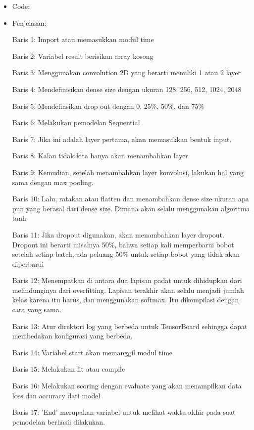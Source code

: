 \begin{itemize}
\item Code:


\item Penjelasan:

Baris 1: Import atau memasukkan modul time

Baris 2: Variabel result berisikan array kosong

Baris 3: Menggunakan convolution 2D yang berarti memiliki 1 atau 2 layer

Baris 4: Mendefinisikan dense size dengan ukuran 128, 256, 512, 1024, 2048

Baris 5: Mendefinsikan drop out dengan 0, 25\%, 50\%, dan 75\%

Baris 6: Melakukan pemodelan Sequential

Baris 7: Jika ini adalah layer pertama, akan memasukkan bentuk input.

Baris 8: Kalau tidak kita hanya akan menambahkan layer.

Baris 9: Kemudian, setelah menambahkan layer konvolusi, lakukan hal yang sama dengan max pooling.

Baris 10: Lalu, ratakan atau flatten dan menambahkan dense size ukuran apa pun yang berasal dari dense size. Dimana akan selalu menggunakan algoritma tanh

Baris 11: Jika dropout digunakan, akan menambahkan layer dropout. Dropout ini berarti misalnya 50\%, bahwa setiap kali memperbarui bobot setelah setiap batch, ada peluang 50\% untuk setiap bobot yang tidak akan diperbarui

Baris 12: Menempatkan di antara dua lapisan padat untuk dihidupkan dari melindunginya dari overfitting. Lapisan terakhir akan selalu menjadi jumlah kelas karena itu harus, dan menggunakan softmax. Itu dikompilasi dengan cara yang sama.

Baris 13: Atur direktori log yang berbeda untuk TensorBoard sehingga dapat membedakan konfigurasi yang berbeda.

Baris 14: Variabel start akan memanggil modul time

Baris 15: Melakukan fit atau compile

Baris 16: Melakukan scoring dengan evaluate yang akan menampilkan data loss dan accuracy dari model

Baris 17: 'End' merupakan variabel untuk melihat waktu akhir pada saat pemodelan berhasil dilakukan.


\end{itemize}
